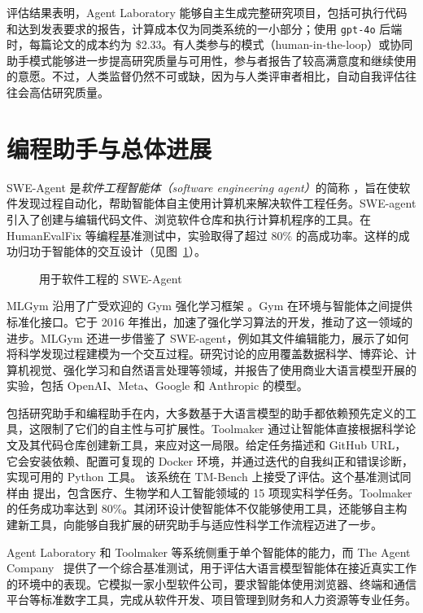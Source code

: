 评估结果表明，Agent Laboratory 能够自主生成完整研究项目，包括可执行代码和达到发表要求的报告，计算成本仅为同类系统的一小部分；使用 \texttt{gpt-4o} 后端时，每篇论文的成本约为 \$2.33。有人类参与的模式（human-in-the-loop）或协同助手模式能够进一步提高研究质量与可用性，参与者报告了较高满意度和继续使用的意愿。不过，人类监督仍然不可或缺，因为与人类评审者相比，自动自我评估往往会高估研究质量。

\section{编程助手与总体进展}

SWE-Agent 是{\em 软件工程智能体（software engineering agent）}的简称 \citep{yang2024swe}，旨在使软件发现过程自动化，帮助智能体自主使用计算机来解决软件工程任务。SWE-agent 引入了创建与编辑代码文件、浏览软件仓库和执行计算机程序的工具。在 HumanEvalFix 等编程基准测试中，实验取得了超过 80\% 的高成功率。这样的成功归功于智能体的交互设计（见图~\ref{fig:swe}）。

\begin{figure}
  \begin{center}
    
    \caption{用于软件工程的 SWE-Agent \citep{yang2024swe}}\label{fig:swe}
  \end{center}
\end{figure}

MLGym \citep{nathani2025mlgym} 沿用了广受欢迎的 Gym 强化学习框架 \citep{brockman2016openai}。Gym 在环境与智能体之间提供标准化接口。它于 2016 年推出，加速了强化学习算法的开发，推动了这一领域的进步。MLGym 还进一步借鉴了 SWE-agent，例如其文件编辑能力，展示了如何将科学发现过程建模为一个交互过程。研究讨论的应用覆盖数据科学、博弈论、计算机视觉、强化学习和自然语言处理等领域，并报告了使用商业大语言模型开展的实验，包括 OpenAI、Meta、Google 和 Anthropic 的模型。

包括研究助手和编程助手在内，大多数基于大语言模型的助手都依赖预先定义的工具，这限制了它们的自主性与可扩展性。Toolmaker \citep{wolflein2025llm} 通过让智能体直接根据科学论文及其代码仓库创建新工具，来应对这一局限。给定任务描述和 GitHub URL，它会安装依赖、配置可复现的 Docker 环境，并通过迭代的自我纠正和错误诊断，实现可用的 Python 工具。
该系统在 TM-Bench 上接受了评估。这个基准测试同样由 \citet{wolflein2025llm} 提出，包含医疗、生物学和人工智能领域的 15 项现实科学任务。Toolmaker 的任务成功率达到 80\%。其闭环设计使智能体不仅能够使用工具，还能够自主构建新工具，向能够自我扩展的研究助手与适应性科学工作流程迈进了一步。

Agent Laboratory 和 Toolmaker 等系统侧重于单个智能体的能力，而 The Agent Company~\citep{xu2024theagentcompany} 提供了一个综合基准测试，用于评估大语言模型智能体在接近真实工作的环境中的表现。它模拟一家小型软件公司，要求智能体使用浏览器、终端和通信平台等标准数字工具，完成从软件开发、项目管理到财务和人力资源等专业任务。

